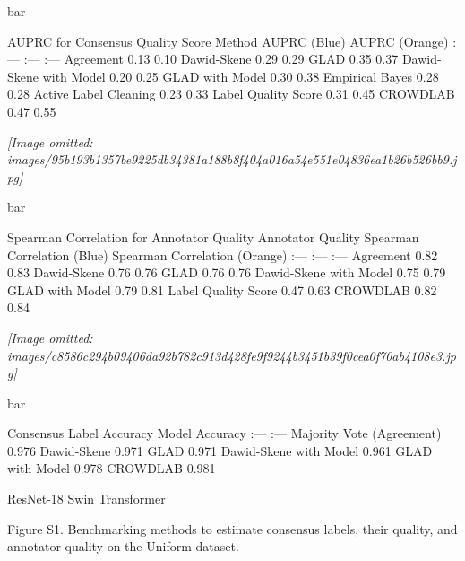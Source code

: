 \documentclass[
]{article}
\begin{document}
bar

AUPRC for Consensus Quality Score \textbar{} Method \textbar{} AUPRC
(Blue) \textbar{} AUPRC (Orange) \textbar{} \textbar{} :--- \textbar{}
:--- \textbar{} :--- \textbar{} \textbar{} Agreement \textbar{} 0.13
\textbar{} 0.10 \textbar{} \textbar{} Dawid-Skene \textbar{} 0.29
\textbar{} 0.29 \textbar{} \textbar{} GLAD \textbar{} 0.35 \textbar{}
0.37 \textbar{} \textbar{} Dawid-Skene with Model \textbar{} 0.20
\textbar{} 0.25 \textbar{} \textbar{} GLAD with Model \textbar{} 0.30
\textbar{} 0.38 \textbar{} \textbar{} Empirical Bayes \textbar{} 0.28
\textbar{} 0.28 \textbar{} \textbar{} Active Label Cleaning \textbar{}
0.23 \textbar{} 0.33 \textbar{} \textbar{} Label Quality Score
\textbar{} 0.31 \textbar{} 0.45 \textbar{} \textbar{} CROWDLAB
\textbar{} 0.47 \textbar{} 0.55 \textbar{}

\textit{[Image omitted: images/95b193b1357be9225db34381a188b8f404a016a54e551e04836ea1b26b526bb9.jpg]}

bar

Spearman Correlation for Annotator Quality \textbar{} Annotator Quality
\textbar{} Spearman Correlation (Blue) \textbar{} Spearman Correlation
(Orange) \textbar{} \textbar{} :--- \textbar{} :--- \textbar{} :---
\textbar{} \textbar{} Agreement \textbar{} 0.82 \textbar{} 0.83
\textbar{} \textbar{} Dawid-Skene \textbar{} 0.76 \textbar{} 0.76
\textbar{} \textbar{} GLAD \textbar{} 0.76 \textbar{} 0.76 \textbar{}
\textbar{} Dawid-Skene with Model \textbar{} 0.75 \textbar{} 0.79
\textbar{} \textbar{} GLAD with Model \textbar{} 0.79 \textbar{} 0.81
\textbar{} \textbar{} Label Quality Score \textbar{} 0.47 \textbar{}
0.63 \textbar{} \textbar{} CROWDLAB \textbar{} 0.82 \textbar{} 0.84
\textbar{}

\textit{[Image omitted: images/c8586c294b09406da92b782c913d428fe9f9244b3451b39f0cea0f70ab4108e3.jpg]}

bar

Consensus Label Accuracy \textbar{} Model \textbar{} Accuracy \textbar{}
\textbar{} :--- \textbar{} :--- \textbar{} \textbar{} Majority Vote
(Agreement) \textbar{} 0.976 \textbar{} \textbar{} Dawid-Skene
\textbar{} 0.971 \textbar{} \textbar{} GLAD \textbar{} 0.971 \textbar{}
\textbar{} Dawid-Skene with Model \textbar{} 0.961 \textbar{} \textbar{}
GLAD with Model \textbar{} 0.978 \textbar{} \textbar{} CROWDLAB
\textbar{} 0.981 \textbar{}

ResNet-18 Swin Transformer

Figure S1. Benchmarking methods to estimate consensus labels, their
quality, and annotator quality on the Uniform dataset.
\end{document}
